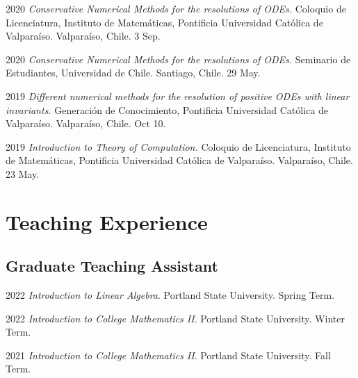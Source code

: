 \documentclass[12pt,letterpaper]{report}
\begin{document}
    \begin{tablist}

        \item[2020] \tab \emph{Conservative Numerical Methods for the resolutions of ODEs.} Coloquio de Licenciatura, Instituto de Matem\'aticas, Pontificia Universidad Cat\'olica de Valpara\'iso. Valpara\'iso, Chile. 3 Sep.
         
        \item[2020] \tab \emph{Conservative Numerical Methods for the resolutions of ODEs.} Seminario de Estudiantes, Universidad de Chile. Santiago, Chile. 29 May.

    	\item[2019] \tab \emph{Different numerical methods for the resolution of positive ODEs with linear invariants.} Generaci\'on de Conocimiento, Pontificia Universidad Cat\'olica de Valpara\'iso. Valpara\'iso, Chile. Oct 10.
    
    	\item[2019] \tab \emph{Introduction to Theory of Computation.} Coloquio de Licenciatura, Instituto de Matem\'aticas, Pontificia Universidad Cat\'olica de Valpara\'iso. Valpara\'iso, Chile. 23 May.
    	
    \end{tablist}



    \section*{Teaching Experience}

    \subsection*{Graduate Teaching Assistant}

    \begin{tablist}

        \item[2022] \tab \emph{Introduction to Linear Algebra}. Portland State University. Spring Term. 
    
        \item[2022] \tab \emph{Introduction to College Mathematics II}. Portland State University. Winter Term. 

        \item[2021] \tab \emph{Introduction to College Mathematics II}. Portland State University. Fall Term. 

    \end{tablist}
\end{document}
